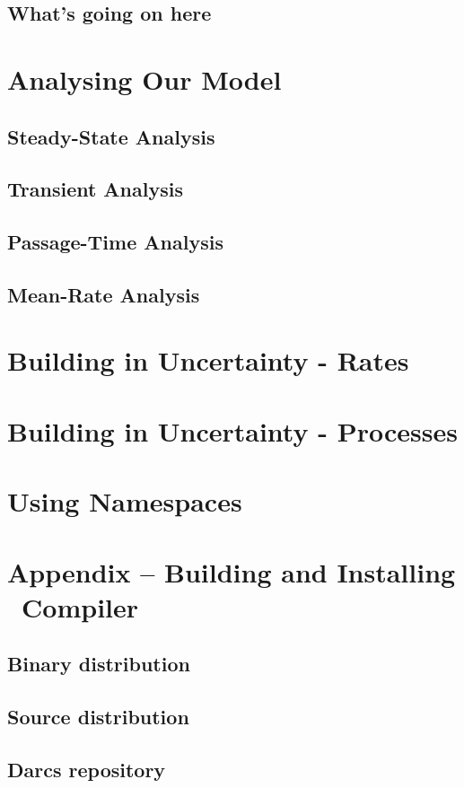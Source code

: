 \documentclass[10pt,a4paper]{article}
\begin{document}
\subsection{What's going on here}
\adcTodo
{}

\section{Analysing Our Model}
\subsection{Steady-State Analysis}
\subsection{Transient Analysis}
\subsection{Passage-Time Analysis}
\subsection{Mean-Rate Analysis}

\section{Building in Uncertainty - Rates}
\section{Building in Uncertainty - Processes}

\section{Using Namespaces}

\appendix
\section{Appendix -- Building and Installing \smc\ Compiler}
\subsection{Binary distribution}
\subsection{Source distribution}
\subsection{Darcs repository}

%
%
\end{document}
